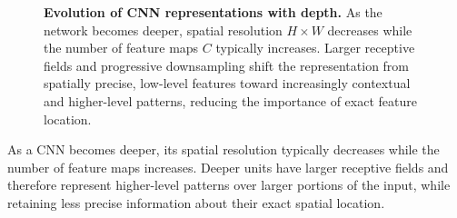 \begin{figure}[!htp]
\begin{tikzpicture}
    \end{tikzpicture}
    \caption{\textbf{Evolution of CNN representations with depth.} As the network becomes deeper, spatial resolution \(H\times W\) decreases while the number of feature maps \(C\) typically increases. Larger receptive fields and progressive downsampling shift the representation from spatially precise, low-level features toward increasingly contextual and higher-level patterns, reducing the importance of exact feature location.}
    \label{fig:how-cnn-representations-change-with-depth}
\end{figure}

\begin{takeawaysbox}
    As a CNN becomes deeper, its spatial resolution typically decreases while the number of feature maps increases. Deeper units have larger receptive fields and therefore represent higher-level patterns over larger portions of the input, while retaining less precise information about their exact spatial location.
\end{takeawaysbox}